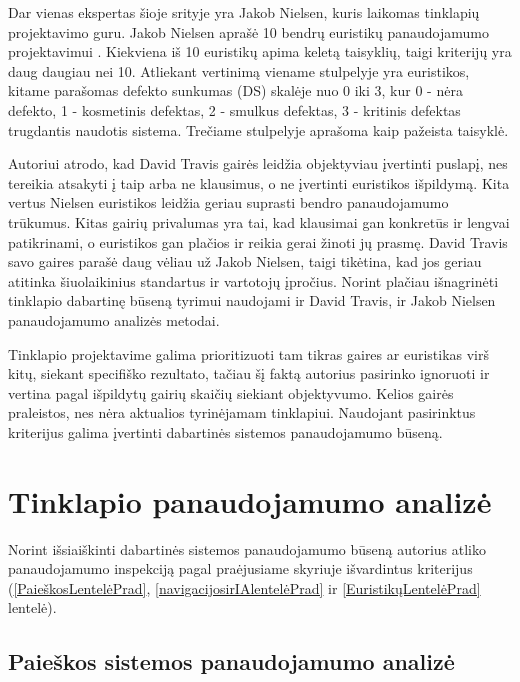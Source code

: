\documentclass{VUMIFPSkursinis}
\begin{document}
Dar vienas ekspertas šioje srityje yra Jakob Nielsen, kuris laikomas tinklapių projektavimo guru. Jakob Nielsen aprašė 10 bendrų euristikų panaudojamumo projektavimui \cite{NielsenHeuristicsEn}. Kiekviena iš 10 euristikų apima keletą taisyklių, taigi kriterijų yra daug daugiau nei 10. Atliekant vertinimą viename stulpelyje yra euristikos, kitame parašomas defekto sunkumas (DS) skalėje nuo 0 iki 3, kur 0 - nėra defekto, 1 - kosmetinis defektas, 2 - smulkus defektas, 3 - kritinis defektas trugdantis naudotis sistema. Trečiame stulpelyje aprašoma kaip pažeista taisyklė.

Autoriui atrodo, kad David Travis gairės leidžia objektyviau įvertinti puslapį, nes tereikia atsakyti į taip arba ne klausimus, o ne įvertinti euristikos išpildymą. Kita vertus Nielsen euristikos leidžia geriau suprasti bendro panaudojamumo trūkumus. Kitas gairių privalumas yra tai, kad klausimai gan konkretūs ir lengvai patikrinami, o euristikos gan plačios ir reikia gerai žinoti jų prasmę. David Travis savo gaires parašė daug vėliau už Jakob Nielsen, taigi tikėtina, kad jos geriau atitinka šiuolaikinius standartus ir vartotojų įpročius. Norint plačiau išnagrinėti tinklapio dabartinę būseną tyrimui naudojami ir David Travis, ir Jakob Nielsen panaudojamumo analizės metodai.

Tinklapio projektavime galima prioritizuoti tam tikras gaires ar euristikas virš kitų, siekant specifiško rezultato, tačiau šį faktą autorius pasirinko ignoruoti ir vertina pagal išpildytų gairių skaičių siekiant objektyvumo. Kelios gairės praleistos, nes nėra aktualios tyrinėjamam tinklapiui. Naudojant pasirinktus kriterijus galima įvertinti dabartinės sistemos panaudojamumo būseną.



\section{Tinklapio panaudojamumo analizė}
Norint išsiaiškinti dabartinės sistemos panaudojamumo būseną autorius atliko panaudojamumo inspekciją pagal praėjusiame skyriuje išvardintus kriterijus (\ref{PaieškosLentelėPrad}, \ref{navigacijosirIAlentelėPrad} ir \ref{EuristikųLentelėPrad} lentelė).
\subsection{Paieškos sistemos panaudojamumo analizė}
\end{document}
